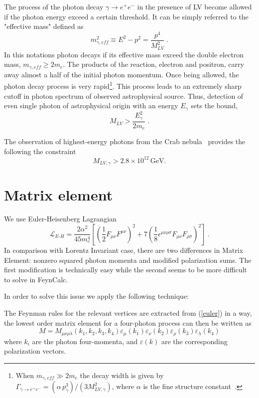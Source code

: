 \documentclass[12pt]{article}
\newcommand{\be}{\begin{equation}}
\newcommand{\ee}{\end{equation}}
\begin{document}
The process of the photon decay 
$\gamma \to e^+e^-$ in the presence of LV become allowed if the photon energy exceed a certain threshold. It can be simply referred to the "effective mass"  defined as 
\be
\label{mgamma}
m^2_{\gamma,eff} \equiv E^2-p^2=\frac{p^4}{M_{LV}^2}\;.
\ee 
In this notations photon decays if its effective mass exceed the double electron mass, $m_{\gamma,eff} \geq 2m_e$. The products of the reaction, electron and positron, carry away almost a half of the initial photon momentum. Once being allowed, the photon decay process is
very rapid\footnote{When $m_{\gamma,eff}\gg 2m_e$ the decay width is given
by
$\Gamma_{\gamma\to e^+e^-}=(\alpha\, p_\gamma^3)/(3 M_{LV,\gamma}^2)$,
where $\alpha$ is the fine structure constant~\cite{Rubtsov:2012kb}.}. 
This process leads to an extremely sharp cutoff in photon spectrum of observed
astrophysical source. Thus, detection of even single 
photon of astrophysical origin with an energy $E_\gamma$ sets the
bound,
\be
\label{photondecaybound}
M_{LV} > \frac{E_\gamma^2}{2m_e}\;.
\ee
 

The observation of highest-energy photons  from
the Crab nebula~\cite{Martinez-Huerta:2016azo} provides the following the constraint
\be
\label{decayrecent}
M_{LV,\gamma} > 2.8\times 10^{12}\,\mbox{GeV}.
\ee




\section{Matrix element}
We use Euler-Heisenberg Lagrangian
\begin{equation}
\mathcal{L}_{E\mbox{-}H}=\frac{2 \alpha^2}{45 m_e^4}
\left[\left(\frac 12 F_{\mu\nu}F^{\mu\nu}\right)^2
+7 \left(\frac 18 \epsilon^{\mu\nu\rho\sigma}
F_{\mu\nu}F_{\rho\sigma}\right)^2\right]~.
\label{euler}
\end{equation}
In comparison with Lorentz Invariant case, there are two differences in Matrix Element: nonzero squared photon momenta and modified polarization sums. The first modification is technically easy while the second seems to be more difficult to solve in FeynCalc.

In order to solve this issue we apply the following technique:

The Feynman rules for the relevant vertices are extracted from (\ref{euler}) in a way, the lowest order matrix element for a four-photon process can then be written as
   \begin{equation}
        M = M_{\mu\nu\rho\lambda}(k_1,k_2,k_3,k_4) \varepsilon_\mu(k_1) \varepsilon_\nu (k_2)\varepsilon_\rho(k_3) \varepsilon_\lambda(k_4)
    \end{equation}
where $k_i$ are the photon four-momenta, and $\varepsilon(k)$ are the corresponding polarization
vectors.    
\end{document}
